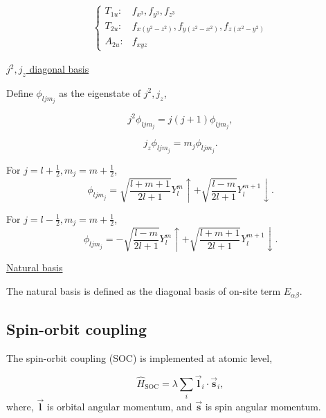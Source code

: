 \begin{gather}
\begin{cases}
T_{1u}: & f_{x^{3}},f_{y^{3}},f_{z^{3}}\\
T_{2u}: & f_{x(y^{2}-z^{2})},f_{y(z^{2}-x^{2})},f_{z(x^{2}-y^{2})}\\
A_{2u}: & f_{xyz}
\end{cases}
\end{gather}



\underline{$j^{2},j_{z}$ diagonal basis}

Define $\phi_{ljm_{j}}$ as the eigenstate of $j^{2},j_{z}$,

\begin{equation}
j^{2}\phi_{ljm_{j}}=j(j+1)\phi_{ljm_{j}},
\end{equation}

\begin{equation}
j_{z}\phi_{ljm_{j}}=m_{j}\phi_{ljm_{j}}.
\end{equation}


For $j=l+\frac{1}{2},m_{j}=m+\frac{1}{2}$,
\begin{equation}
\phi_{ljm_{j}}=\sqrt{\frac{l+m+1}{2l+1}}Y_{l}^{m}\uparrow+\sqrt{\frac{l-m}{2l+1}}Y_{l}^{m+1}\downarrow.
\end{equation}

For $j=l-\frac{1}{2},m_{j}=m+\frac{1}{2}$,
\begin{equation}
\phi_{ljm_{j}}=-\sqrt{\frac{l-m}{2l+1}}Y_{l}^{m}\uparrow+\sqrt{\frac{l+m+1}{2l+1}}Y_{l}^{m+1}\downarrow.
\end{equation}



\underline{Natural basis}

The natural basis is defined as the diagonal basis of on-site term $E_{\alpha\beta}$.


\subsection{Spin-orbit coupling}
The spin-orbit coupling (SOC) is implemented at atomic level, 

\begin{equation}
\hat{H}_{\text{SOC}}=\lambda\sum_{i}\vec{\mathbf{l}}_{i}\cdot\vec{\mathbf{s}}_{i},
\end{equation}
where, $\vec{\mathbf{l}}$ is orbital angular momentum, and $\vec{\mathbf{s}}$ is spin angular momentum. 

